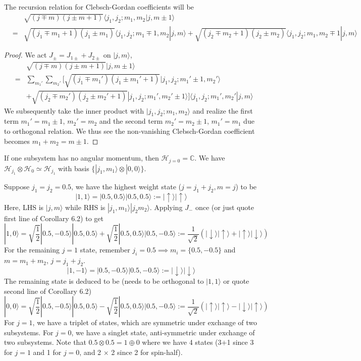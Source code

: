 \documentclass[a4paper]{article}
\begin{document}
\begin{thm}
The recursion relation for Clebsch-Gordan coefficients will be
\begin{eqnarray}
& &\sqrt{(j\mp m)(j\pm m+1)}\langle j_1,j_2;m_1,m_2|j,m\pm1\rangle\nonumber\\
&=&\sqrt{(j_1\mp m_1+1)(j_1\pm m_1)}\langle j_1,j_2;m_1\mp 1, m_2|j,m\rangle+\sqrt{(j_2\mp m_2+1)(j_2\pm m_2)}\langle j_1,j_2;m_1,m_2\mp 1|j,m\rangle\nonumber
\end{eqnarray}
\end{thm}
\begin{proof}
We act $J_{\pm}=J_{1\pm}+J_{2\pm}$ on $|j,m\rangle$,
\begin{eqnarray}
& &\sqrt{(j\mp m)(j\pm m+1)}|j,m\pm1\rangle\nonumber\\
&=&\sum_{m_1'}\sum_{m_2'}\bigg[\sqrt{(j_1\mp m_1')(j_1\pm m_1'+1)}|j_1,j_2;m_1'\pm1,m_2'\rangle\nonumber\\&&+\sqrt{(j_2\mp m_2')(j_2\pm m_2'+1)}|j_1,j_2;m_1',m_2'\pm1\rangle\bigg]\langle j_1,j_2;m_1',m_2'|j,m\rangle\nonumber
\end{eqnarray}
We subsequently take the inner product with $|j_1,j_2;m_1,m_2\rangle$ and realize the first term $m_1'=m_1\pm 1$, $m_2'=m_2$ and the second term $m_2'=m_2\pm 1$, $m_1'=m_1$ due to orthogonal relation. We thus see the non-vanishing Clebsch-Gordan coefficient becomes $m_1+m_2=m\pm 1$.
\end{proof}
\begin{eg}[$j\otimes0=j$]
If one subsystem has no angular momentum, then $\mathcal{H}_{j=0}=\mathbb{C}$. We have $\mathcal{H}_{j_1}\otimes\mathcal{H}_0\simeq\mathcal{H}_{j_1}$ with basis $\{|j_1,m_1\rangle\otimes|0,0\rangle\}$.
\end{eg}
\begin{eg}[$0.5\otimes0.5=1\oplus0$]
Suppose $j_1=j_2=0.5$, we have the highest weight state ($j=j_1+j_2,m=j$) to be $$|1,1\rangle=|0.5,0.5\rangle|0.5,0.5\rangle:=|\uparrow\rangle|\uparrow\rangle$$ 
Here, LHS is $|j,m\rangle$ while RHS is $|j_1,m_1\rangle|j_2m_2\rangle$. Applying $J_-$ once (or just quote first line of Corollary 6.2) to get $$|1,0\rangle=\sqrt{\frac{1}{2}}|0.5,-0.5\rangle|0.5,0.5\rangle+\sqrt{\frac{1}{2}}|0.5,0.5\rangle|0.5,-0.5\rangle:=\frac{1}{\sqrt{2}}(|\downarrow\rangle|\uparrow\rangle+|\uparrow\rangle|\downarrow\rangle)$$
For the remaining $j=1$ state, remember $j_i=0.5\implies m_i=\{0.5,-0.5\}$ and $m=m_1+m_2$, $j=j_1+j_2$.
$$|1,-1\rangle=|0.5,-0.5\rangle|0.5,-0.5\rangle:=|\downarrow\rangle|\downarrow\rangle$$ 
The remaining state is deduced to be (needs to be orthogonal to $|1,1\rangle$ or quote second line of Corollary 6.2)
$$|0,0\rangle=\sqrt{\frac{1}{2}}|0.5,-0.5\rangle|0.5,0.5\rangle-\sqrt{\frac{1}{2}}|0.5,0.5\rangle|0.5,-0.5\rangle:=\frac{1}{\sqrt{2}}(|\uparrow\rangle|\uparrow\rangle-|\downarrow\rangle|\uparrow\rangle)$$
For $j=1$, we have a triplet of states, which are symmetric under exchange of two subsystems. For $j=0$, we have a singlet state, anti-symmetric under exchange of two subsystems. Note that $0.5\otimes0.5=1\oplus0$ where we have 4 states (3$+$1 since 3 for $j=1$ and 1 for $j=0$, and 2 $\times$ 2 since 2 for spin-half).
\end{eg}
\end{document}
